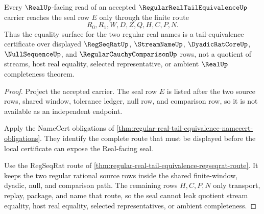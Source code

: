\begin{theorem}
\label{thm:regular-real-tail-equivalence-real-seal-nonescape}
Every $\RealUp$-facing read of an accepted $\RegularRealTailEquivalenceUp$ carrier reaches the seal row $E$ only through the finite route
$$
R_0,R_1,W,D,Z,Q,H,C,P,N.
$$
Thus the equality surface for the two regular real names is a tail-equivalence certificate over displayed $\RegSeqRatUp$, $\StreamNameUp$, $\DyadicRatCoreUp$, $\NullSequenceUp$, and $\RegularCauchyComparisonUp$ rows, not a quotient of streams, host real equality, selected representative, or ambient $\RealUp$ completeness theorem.
\end{theorem}
\begin{proof}
Project the accepted carrier. The seal row $E$ is listed after the two source rows, shared window, tolerance ledger, null row, and comparison row, so it is not available as an independent endpoint.

Apply the NameCert obligations of \autoref{thm:regular-real-tail-equivalence-namecert-obligations}. They identify the complete route that must be displayed before the local certificate can expose the Real-facing seal.

Use the RegSeqRat route of \autoref{thm:regular-real-tail-equivalence-regseqrat-route}. It keeps the two regular rational source rows inside the shared finite-window, dyadic, null, and comparison path. The remaining rows $H,C,P,N$ only transport, replay, package, and name that route, so the seal cannot leak quotient stream equality, host real equality, selected representatives, or ambient completeness.
\end{proof}


